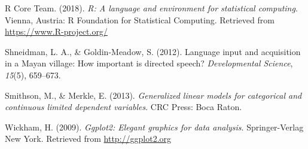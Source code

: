 \documentclass[floatsintext,man]{apa6}
\theoremstyle{definition}
\theoremstyle{definition}
\theoremstyle{definition}
\theoremstyle{remark}
\begin{document}
\hypertarget{ref-R-base}{}
R Core Team. (2018). \emph{R: A language and environment for statistical
computing}. Vienna, Austria: R Foundation for Statistical Computing.
Retrieved from \url{https://www.R-project.org/}

\hypertarget{ref-shneidman2012language}{}
Shneidman, L. A., \& Goldin-Meadow, S. (2012). Language input and
acquisition in a Mayan village: How important is directed speech?
\emph{Developmental Science}, \emph{15}(5), 659--673.

\hypertarget{ref-smithson2013generalized}{}
Smithson, M., \& Merkle, E. (2013). \emph{Generalized linear models for
categorical and continuous limited dependent variables}. CRC Press: Boca
Raton.

\hypertarget{ref-R-ggplot2}{}
Wickham, H. (2009). \emph{Ggplot2: Elegant graphics for data analysis}.
Springer-Verlag New York. Retrieved from \url{http://ggplot2.org}

\endgroup
\end{document}
